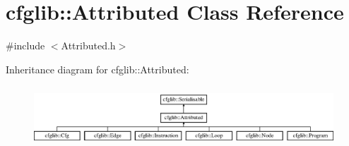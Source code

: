 \hypertarget{classcfglib_1_1Attributed}{}\section{cfglib\+:\+:Attributed Class Reference}
\label{classcfglib_1_1Attributed}


{\ttfamily \#include $<$Attributed.\+h$>$}

Inheritance diagram for cfglib\+:\+:Attributed\+:\begin{figure}[H]
\begin{center}
\leavevmode
\includegraphics[height=2.276423cm]{classcfglib_1_1Attributed}
\end{center}
\end{figure}
